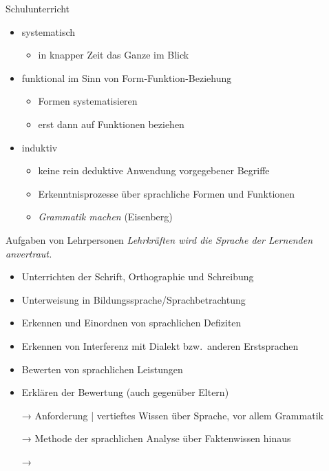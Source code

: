\begin{frame}
  {Schulunterricht}
  \onslide<+->
  \begin{itemize}[<+->]
    \item \alert{systematisch}
      \begin{itemize}
        \item in knapper Zeit das Ganze im Blick
      \end{itemize}
      \Zeile
    \item funktional im Sinn von \alert{Form-Funktion-Beziehung}
      \begin{itemize}
        \item Formen systematisieren
        \item erst dann auf Funktionen beziehen
      \end{itemize}
      \Zeile
    \item \alert{induktiv}
      \begin{itemize}
        \item keine rein deduktive Anwendung vorgegebener Begriffe
        \item Erkenntnisprozesse über sprachliche Formen und Funktionen
        \item \alert{\textit{Grammatik machen}} (Eisenberg)
      \end{itemize}
  \end{itemize}
\end{frame}

\begin{frame}
  {Aufgaben von Lehrpersonen}
  \onslide<+->
  \onslide<+->
  \alert{\textit{Lehrkräften wird die Sprache der Lernenden anvertraut.}} \\
  \Zeile
  \begin{itemize}[<+->]
    \item Unterrichten der Schrift, Orthographie und Schreibung
    \item Unterweisung in Bildungssprache\slash Sprachbetrachtung
    \item Erkennen und \alert{Einordnen} von \alert{sprachlichen Defiziten}
    \item Erkennen von \alert{Interferenz mit Dialekt bzw.\ anderen Erstsprachen}
    \item \alert{Bewerten} von sprachlichen Leistungen
    \item \alert{Erklären} der Bewertung (auch gegenüber Eltern)
      \Zeile
    \item[→] Anforderung | vertieftes Wissen über Sprache, vor allem Grammatik
    \item[→] Methode der sprachlichen Analyse über Faktenwissen hinaus
    \item[→] 
  \end{itemize}
\end{frame}



